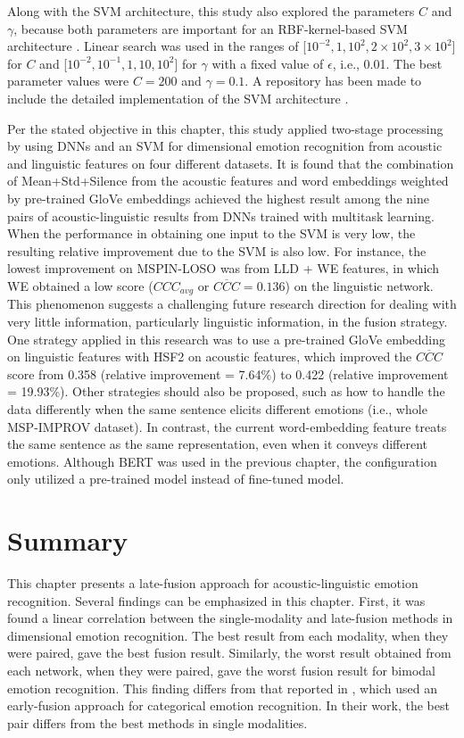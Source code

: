 Along with the SVM architecture, this study also explored the parameters $C$
and $\gamma$, because both parameters are important for an RBF-kernel-based SVM
architecture \cite{scikit-learn}. Linear search was used in the ranges of
[$10^{-2}, 1, 10^2, 2 \times 10^2, 3 \times 10^2$] for $C$ and [$10^{-2},
10^{-1}, 1, 10, 10^2$] for $\gamma$ with a fixed value of $\epsilon$, i.e.,
0.01. The best parameter values were $C=200$ and $\gamma=0.1$. A repository has
been made to include the detailed implementation of the SVM architecture
\cite{Atmaja2020l}.

Per the stated objective in this chapter, this study applied two-stage
processing by using DNNs and an SVM for dimensional emotion recognition from
acoustic and linguistic features on four different datasets. It is found that
the combination of Mean+Std+Silence from the acoustic features and word
embeddings weighted by pre-trained GloVe embeddings achieved the highest result
among the nine pairs of acoustic-linguistic results from DNNs trained with
multitask learning. When the performance in obtaining one input to the SVM is
very low, the resulting relative improvement due to the SVM is also low. For
instance, the lowest improvement on MSPIN-LOSO was from LLD + WE features, in
which WE obtained a low score ($CCC_{avg}$ or $\overline{CCC}=0.136$) on
the linguistic network. This phenomenon suggests a challenging future research
direction for dealing with very little information, particularly linguistic
information, in the fusion strategy. One strategy applied in this research was
to use a pre-trained GloVe embedding on linguistic features with HSF2 on
acoustic features, which improved the $\overline{CCC}$ score from 0.358
(relative improvement = 7.64\%) to 0.422 (relative improvement = 19.93\%).
Other strategies should also be proposed, such as how to handle the data
differently when the same sentence elicits different emotions (i.e., whole
MSP-IMPROV dataset). In contrast, the current word-embedding feature treats the
same sentence as the same representation, even when it conveys different
emotions. Although BERT was used in the previous chapter, the configuration
only utilized a pre-trained model instead of fine-tuned model.


\section{Summary}
This chapter presents a late-fusion approach for acoustic-linguistic emotion
recognition. Several findings can be emphasized in this chapter. First, it was
found a linear correlation between the single-modality and late-fusion methods
in dimensional emotion recognition. The best result from each modality, when
they were paired, gave the best fusion result. Similarly, the worst result
obtained from each network, when they were paired, gave the worst fusion
result for bimodal emotion recognition. This finding differs from that
reported in \cite{Atmaja2019b}, which used an early-fusion approach for
categorical emotion recognition. In their work, the best pair differs from the
best methods in single modalities.

